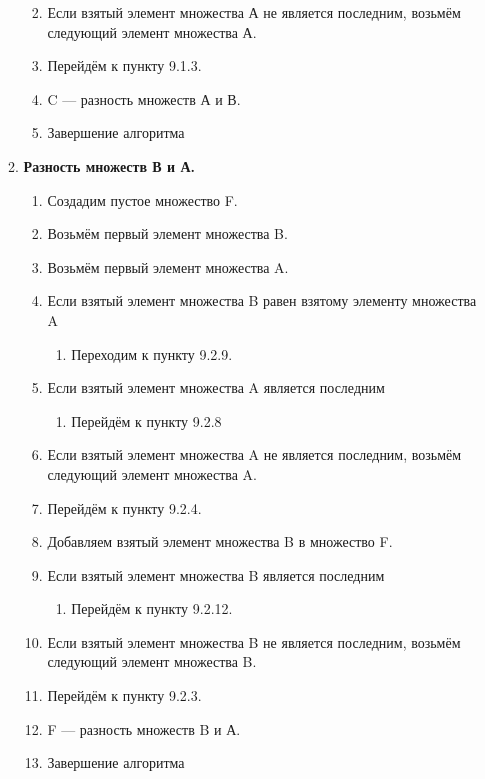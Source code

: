 \documentclass[a4paper,12pt]{extarticle}
\begin{document}
\begin{enumerate}
\begin{enumerate}[label*=\arabic*.]
\begin{enumerate}[label*=\arabic*.]
\begin{enumerate}[label*=\arabic*.]
      \end{enumerate}
      \item Если взятый элемент множества А не является последним, возьмём следующий элемент множества А.
      \item Перейдём к пункту 9.1.3.
      \item C — разность множеств А и В.
      \item Завершение алгоритма
    \end{enumerate}
    \item \textbf{Разность множеств В и А.}
    \begin{enumerate}[label*=\arabic*.]
      \item Создадим пустое множество F.
      \item Возьмём первый элемент множества B.
      \item Возьмём первый элемент множества A.
      \item Если взятый элемент множества B равен взятому элементу множества A
      \begin{enumerate}[label*=\arabic*.]
        \item Переходим к пункту 9.2.9.
      \end{enumerate}
      \item Если взятый элемент множества A является последним
      \begin{enumerate}
        \item Перейдём к пункту 9.2.8
      \end{enumerate}
      \item Если взятый элемент множества A не является последним, возьмём следующий элемент множества A.
      \item Перейдём к пункту 9.2.4.
      \item Добавляем взятый элемент множества B в множество F.
      \item Если взятый элемент множества B является последним
      \begin{enumerate}[label*=\arabic*.]
        \item Перейдём к пункту 9.2.12.
      \end{enumerate}
      \item Если взятый элемент множества B не является последним, возьмём следующий элемент множества B.
      \item Перейдём к пункту 9.2.3.
      \item F — разность множеств B и А.
      \item Завершение алгоритма

\end{enumerate}
\end{enumerate}
\end{enumerate}
\end{document}
